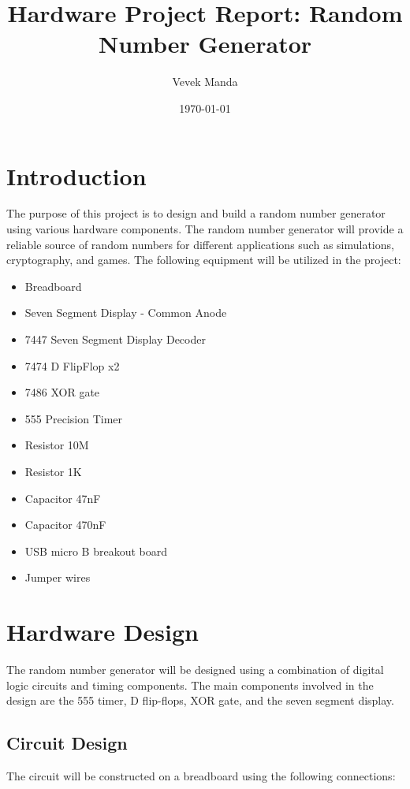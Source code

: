 \documentclass[a4paper,12pt]{article}
\begin{document}
\title{Hardware Project Report: Random Number Generator}
\author{Vevek Manda}
\date{\today}

\maketitle

\section{Introduction}
The purpose of this project is to design and build a random number generator using various hardware components. The random number generator will provide a reliable source of random numbers for different applications such as simulations, cryptography, and games. The following equipment will be utilized in the project:

\begin{itemize}
  \item Breadboard
  \item Seven Segment Display - Common Anode
  \item 7447 Seven Segment Display Decoder
  \item 7474 D FlipFlop x2
  \item 7486 XOR gate
  \item 555 Precision Timer
  \item Resistor 10M
  \item Resistor 1K
  \item Capacitor 47nF
  \item Capacitor 470nF
  \item USB micro B breakout board
  \item Jumper wires
\end{itemize}

\section{Hardware Design}
The random number generator will be designed using a combination of digital logic circuits and timing components. The main components involved in the design are the 555 timer, D flip-flops, XOR gate, and the seven segment display.

\subsection{Circuit Design}
The circuit will be constructed on a breadboard using the following connections:
\end{document}

